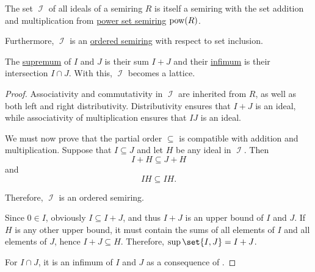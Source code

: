 \begin{proposition}\label{thm:semiring_of_ideals}
  \hfill
  \begin{thmenum}
     The set \( \mscrI \) of all ideals of a semiring \( R \) is itself a semiring with the set addition and multiplication from \hyperref[def:semiring/power_set]{power set semiring} \( \operatorname{pow}(R) \).

     Furthermore, \( \mscrI \) is an \hyperref[def:ordered_semiring]{ordered semiring} with respect to set inclusion.

     The \hyperref[def:partially_ordered_set_extremal_points/supremum_and_infimum]{supremum} of \( I \) and \( J \) is their sum \( I + J \) and their \hyperref[def:partially_ordered_set_extremal_points/supremum_and_infimum]{infimum} is their intersection \( I \cap J \). With this, \( \mscrI \) becomes a lattice.
  \end{thmenum}
\end{proposition}
\begin{proof}
   Associativity and commutativity in \( \mscrI \) are inherited from \( R \), as well as both left and right distributivity. Distributivity ensures that \( I + J \) is an ideal, while associativity of multiplication ensures that \( IJ \) is an ideal.

   We must now prove that the partial order \( \subseteq \) is compatible with addition and multiplication. Suppose that \( I \subseteq J \) and let \( H \) be any ideal in \( \mscrI \). Then
  \begin{equation*}
    I + H \subseteq J + H
  \end{equation*}
  and
  \begin{equation*}
    IH \subseteq IH.
  \end{equation*}

  Therefore, \( \mscrI \) is an ordered semiring.

   Since \( 0 \in I \), obviously \( I \subseteq I + J \), and thus \( I + J \) is an upper bound of \( I \) and \( J \). If \( H \) is any other upper bound, it must contain the sums of all elements of \( I \) and all elements of \( J \), hence \( I + J \subseteq H \). Therefore, \( \sup\set{I, J} = I + J \).

  For \( I \cap J \), it is an infimum of \( I \) and \( J \) as a consequence of .
\end{proof}

